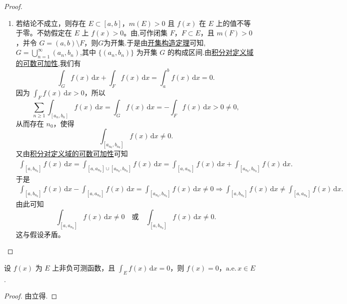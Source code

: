 \documentclass[../../main.tex]{subfiles}%
\begin{document}
\begin{proof}
\begin{enumerate}[(1)]
\item 若结论不成立，则存在 $E \subset [a,b]$，$m(E) > 0$ 且 $f(x)$ 在 $E$ 上的值不等于零。不妨假定在 $E$ 上 $f(x) > 0$。由,可作闭集 $F$，$F \subset E$，且 $m(F) > 0$，并令 $G = (a,b) \setminus F$，则$G$为开集.于是由\hyperref[theorem:开集构造定理]{开集构造定理}可知,$G=\bigcup_{n=1}^{\infty}{\left( a_n,b_n \right)}$,其中 $\{ (a_n, b_n) \}$ 为开集 $G$ 的构成区间.由\hyperref[theorem:积分对定义域的可数可加性]{积分对定义域的可数可加性},我们有
\[
\int_G f(x) \, \mathrm{d}x + \int_F f(x) \, \mathrm{d}x = \int_a^b f(x) \, \mathrm{d}x = 0.
\]
因为 $\int_F f(x) \, \mathrm{d}x > 0$，所以
\[
\sum_{n \geqslant 1} \int_{[a_n, b_n]} f(x) \, \mathrm{d}x = \int_G f(x) \, \mathrm{d}x = -\int_F f(x) \, \mathrm{d}x > 0\neq 0,
\]
从而存在 $n_0$，使得
\[
\int_{[a_{n_0}, b_{n_0}]} f(x) \, \mathrm{d}x \neq 0.
\]
又由\hyperref[theorem:积分对定义域的可数可加性]{积分对定义域的可数可加性}可知
\begin{align*}
\int_{[a,b_{n_0}]}{f(x)\,\mathrm{d}x}=\int_{[a,a_{n_0}]\cup [a_{n_0},b_{n_0}]}{f(x)\,\mathrm{d}x}=\int_{[a,a_{n_0}]}{f(x)\,\mathrm{d}x}+\int_{[a_{n_0},b_{n_0}]}{f(x)\,\mathrm{d}x.}
\end{align*}
于是
\begin{align*}
\int_{[a,b_{n_0}]}{f(x)\,\mathrm{d}x}-\int_{[a,a_{n_0}]}{f(x)\,\mathrm{d}x}=\int_{[a_{n_0},b_{n_0}]}{f(x)\,\mathrm{d}x}\ne 0\Rightarrow \int_{[a,b_{n_0}]}{f(x)\,\mathrm{d}x}\ne \int_{[a,a_{n_0}]}{f(x)\,\mathrm{d}x}.
\end{align*}
由此可知
\[
\int_{[a, a_{n_0}]} f(x) \, \mathrm{d}x \neq 0 \quad \text{或} \quad \int_{[a, b_{n_0}]} f(x) \, \mathrm{d}x \neq 0.
\]
这与假设矛盾。
\end{enumerate}
\end{proof}

\begin{corollary}\label{corollary:非负可测函数积分为0则几乎处处为0}
设 \( f(x) \) 为 \( E \) 上非负可测函数，且 \( \int_E f(x)\,\mathrm{d}x = 0 \)，则 \( f(x) = 0 \)，\(\text{a.e.}\, x \in E \). 
\end{corollary}
\begin{proof}
由立得.
\end{proof}
\end{document}
